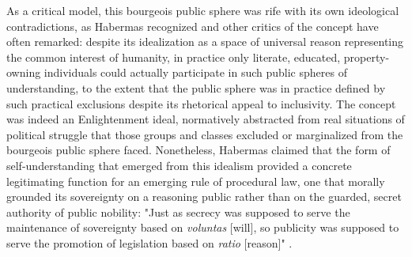As a critical model, this bourgeois public sphere was rife with its own ideological contradictions, as Habermas recognized and other critics of the concept have often remarked: despite its idealization as a space of universal reason representing the common interest of humanity, in practice only literate, educated, property-owning individuals could actually participate in such public spheres of understanding, to the extent that the public sphere was in practice defined by such practical exclusions despite its rhetorical appeal to inclusivity. The concept was indeed an Enlightenment ideal, normatively abstracted from real situations of political struggle that those groups and classes excluded or marginalized from the bourgeois public sphere faced. Nonetheless, Habermas claimed that the form of self-understanding that emerged from this idealism provided a concrete legitimating function for an emerging rule of procedural law, one that morally grounded its sovereignty on a reasoning public rather than on the guarded, secret authority of public nobility: "Just as secrecy was supposed to serve the maintenance of sovereignty based on \emph{voluntas} [will], so publicity was supposed to serve the promotion of legislation based on \emph{ratio} [reason]" \autocite[53]{Habermas1989}.

